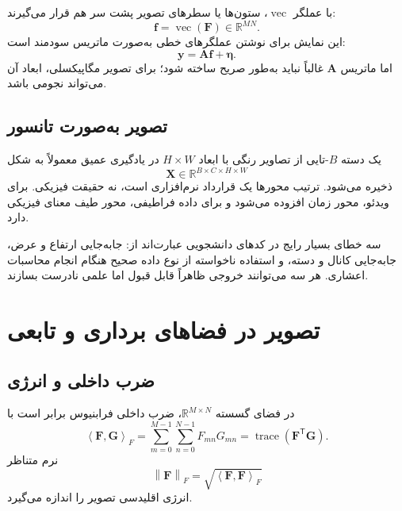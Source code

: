 \documentclass[12pt,openany,oneside]{book}
\newcommand{\R}{\mathbb{R}}
\newcommand{\norm}[1]{\left\lVert #1\right\rVert}
\newcommand{\inner}[2]{\left\langle #1,#2\right\rangle}
\newcommand{\trans}{^{\mathsf T}}
\newcommand{\vect}[1]{\bm{#1}}
\begin{document}
با عملگر \(\operatorname{vec}\)، ستون‌ها یا سطرهای تصویر پشت سر هم قرار می‌گیرند:
\begin{equation}
\vect f=\operatorname{vec}(\vect F)\in\R^{MN}.
\end{equation}
این نمایش برای نوشتن عملگرهای خطی به‌صورت ماتریس سودمند است:
\begin{equation}
\vect y=\vect A\vect f+\vect\eta.
\end{equation}
اما ماتریس \(\vect A\) غالباً نباید به‌طور صریح ساخته شود؛ برای تصویر مگاپیکسلی، ابعاد آن می‌تواند نجومی باشد.

\subsection{تصویر به‌صورت تانسور}

یک دسته \(B\)-تایی از تصاویر رنگی با ابعاد \(H\times W\) در یادگیری عمیق معمولاً به شکل
\begin{equation}
\vect X\in\R^{B\times C\times H\times W}
\end{equation}
ذخیره می‌شود. ترتیب محورها یک قرارداد نرم‌افزاری است، نه حقیقت فیزیکی.
برای ویدئو، محور زمان افزوده می‌شود و برای داده فراطیفی، محور طیف معنای فیزیکی دارد.

\begin{warningbox}
سه خطای بسیار رایج در کدهای دانشجویی عبارت‌اند از: جابه‌جایی ارتفاع و عرض، جابه‌جایی کانال و دسته،
و استفاده ناخواسته از نوع داده صحیح هنگام انجام محاسبات اعشاری. هر سه می‌توانند خروجی ظاهراً قابل قبول اما علمی نادرست بسازند.
\end{warningbox}

\section{تصویر در فضاهای برداری و تابعی}

\subsection{ضرب داخلی و انرژی}

در فضای گسسته \(\R^{M\times N}\)، ضرب داخلی فرابنیوس برابر است با
\begin{equation}
\inner{\vect F}{\vect G}_F
=\sum_{m=0}^{M-1}\sum_{n=0}^{N-1}F_{mn}G_{mn}
=\operatorname{trace}(\vect F\trans\vect G).
\end{equation}
نرم متناظر
\begin{equation}
\norm{\vect F}_F=\sqrt{\inner{\vect F}{\vect F}_F}
\end{equation}
انرژی اقلیدسی تصویر را اندازه می‌گیرد.
\end{document}
